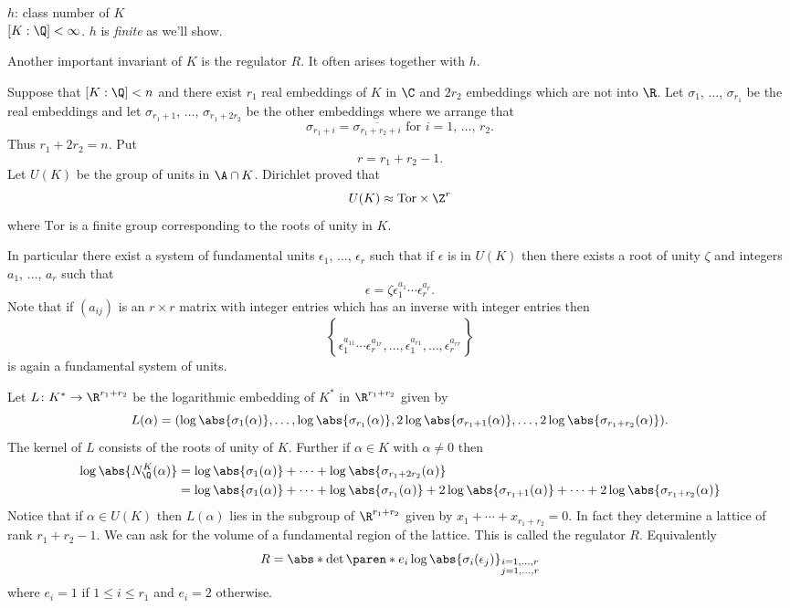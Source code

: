 $h$: class number of $K$ \\
$[K:\Q]<\infty$.  $h$ is \emph{finite} as we'll show.

Another important invariant of $K$ is the regulator $R$.  It often arises together with $h$.

Suppose that $[K:\Q]<n$ and there exist $r_1$ real embeddings of $K$ in $\C$ and $2r_2$ embeddings which are not into $\R$.  Let $\sigma_1$, $\dotsc$, $\sigma_{r_1}$ be the real embeddings and let $\sigma_{r_1+1}$, $\dotsc$, $\sigma_{r_1+2r_2}$ be the other embeddings where we arrange that
\[ \sigma_{r_1+i} = \overline{\sigma_{r_1+r_2+i}} \text{ for $i=1$, $\dotsc$, $r_2$.} \]
Thus $r_1+2r_2=n$.  Put
\[ r = r_1 + r_2 - 1 . \]
Let $U(K)$ be the group of units in $\A\cap K$.  Dirichlet proved that
\[ U(K) \approx \text{Tor}\times\Z^r \]
where $\text{Tor}$ is a finite group corresponding to the roots of unity in $K$.

In particular there exist a system of fundamental units $\epsilon_1$, $\dotsc$, $\epsilon_r$ such that if $\epsilon$ is in $U(K)$ then there exists a root of unity $\zeta$ and integers $a_1$, $\dotsc$, $a_r$ such that
\[ \epsilon = \zeta \epsilon_1^{a_1}\dotsm\epsilon_r^{a_r} . \]
Note that if $(a_{ij})$ is an $r\times r$ matrix with integer entries which has an inverse with integer entries then
\[ \brace{\epsilon_1^{a_{11}}\dotsm\epsilon_r^{a_{1r}},\dotsc,\epsilon_1^{a_{r1}},\dotsc,\epsilon_r^{a_{rr}}} \]
is again a fundamental system of units.

Let $L\colon K^*\to\R^{r_1+r_2}$ be the logarithmic embedding of $K^*$ in $\R^{r_1+r_2}$ given by
\[ L(\alpha) = (\log\abs{\sigma_1(\alpha)},\dotsc,\log\abs{\sigma_{r_1}(\alpha)},2\log\abs{\sigma_{r_1+1}(\alpha)},\dotsc,2\log\abs{\sigma_{r_1+r_2}(\alpha)}) . \]
The kernel of $L$ consists of the roots of unity of $K$.  Further if $\alpha\in K$ with $\alpha\neq0$ then
\begin{align*}
\log\abs{N_\Q^K(\alpha)} &= \log\abs{\sigma_1(\alpha)} + \dotsb + \log\abs{\sigma_{r_1+2r_2}(\alpha)} \\
&= \log\abs{\sigma_1(\alpha)} + \dotsb + \log\abs{\sigma_{r_1}(\alpha)} + 2\log\abs{\sigma_{r_1+1}(\alpha)}+\dotsb+2\log\abs{\sigma_{r_1+r_2}(\alpha)}
\end{align*}
Notice that if $\alpha\in U(K)$ then $L(\alpha)$ lies in the subgroup of $\R^{r_1+r_2}$ given by $x_1+\dotsb+x_{r_1+r_2}=0$.  In fact they determine a lattice of rank $r_1+r_2-1$.  We can ask for the volume of a fundamental region of the lattice.  This is called the regulator $R$.  Equivalently
\[ R = \abs*{\det\paren*{e_i\log\abs{\sigma_i(\epsilon_j)}}_{\substack{i=1,\dotsc,r\\j=1,\dotsc,r}}} \]
where $e_i=1$ if $1\leq i\leq r_1$ and $e_i=2$ otherwise.

